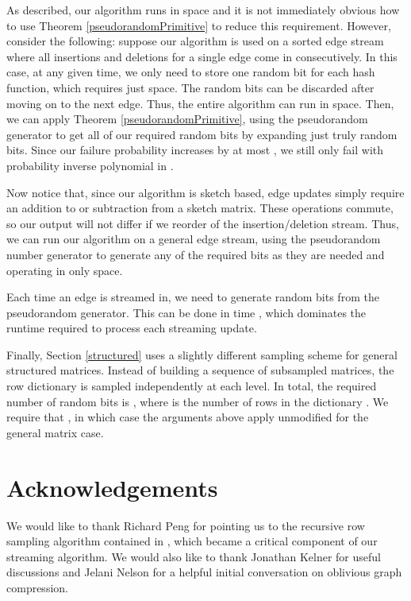 \documentclass[11pt]{article}
\begin{document}
As described, our algorithm runs in  space and it is not immediately obvious how to use Theorem \ref{pseudorandomPrimitive} to reduce this requirement.
However, consider the following: suppose our algorithm is used on a sorted edge stream where all insertions and deletions for a single edge come in consecutively. In this case, at any given time, we only need to store one random bit for each hash function, which requires just  space. The random bits can be discarded after moving on to the next edge. Thus, the entire algorithm can run in  space. Then, we can apply Theorem \ref{pseudorandomPrimitive}, using the pseudorandom generator to get all of our required random bits by expanding just  truly random bits. 
Since our failure probability increases by at most , we still only fail with probability inverse polynomial in . 

Now notice that, since our algorithm is sketch based, edge updates simply require an addition to or subtraction from a sketch matrix. These operations commute, so our output will not differ if we reorder of the insertion/deletion stream. Thus, we can run our algorithm on a general edge stream, using the pseudorandom number generator to generate any of the required  bits as they are needed and operating in only  space.

Each time an edge is streamed in, we need to generate  random bits from the pseudorandom generator. This can be done in  time \cite{indyk2000stable}, which dominates the runtime required to process each streaming update.

Finally, Section \ref{structured} uses a slightly different sampling scheme for general structured matrices. Instead of building a sequence of subsampled matrices, the row dictionary is sampled independently at each level. In total, the required number of random bits is , where  is the number of rows in the dictionary . We require that , in which case the arguments above apply unmodified for the general matrix case.







\section{Acknowledgements}
We would like to thank Richard Peng for pointing us to the recursive row sampling algorithm contained in \cite{pengV1}, which became a critical component of our streaming algorithm. 
We would also like to thank Jonathan Kelner for useful discussions and Jelani Nelson for a helpful initial conversation on oblivious graph compression.
\end{document}
